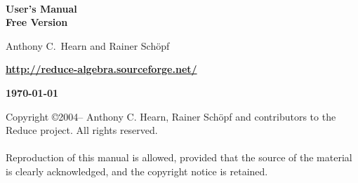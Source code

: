 \begin{titlepage}
\setcounter{page}{-1}
\vspace*{\fill}
\begin{center}

{\Huge\bf {\REDUCE}} \\ [0.2cm]
{\LARGE\bf User's Manual\vspace{0.4cm} \\
  Free Version \\[0.5in]

}

\large\bf

Anthony C.\ Hearn %
and
Rainer Sch\"{o}pf

\vspace{0.1in}

\textbf{\url{http://reduce-algebra.sourceforge.net/}}

\vspace{0.5in}

\large\bf \today

\end{center}
\vspace{3.0in}
\end{titlepage}

\newpage
\vspace*{3.0in}
\noindent Copyright \copyright 2004--\the\year{} Anthony C. Hearn,
Rainer Sch\"{o}pf and contributors to the Reduce project.
All rights reserved. \\
\mbox{}\\
%
\noindent Reproduction of this manual is allowed, provided that the source of the
material is clearly acknowledged, and the copyright notice is retained.

